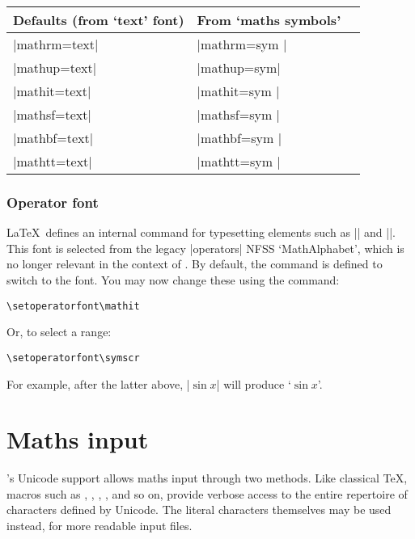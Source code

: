 \begin{table}
  \centering
  \begin{tabular}{lll}
    \toprule
    Defaults (from `text' font) & From `maths symbols' \\
    \midrule
    |mathrm=text| &   |mathrm=sym |  \\
    |mathup=text|\rlap{$^\ast$} &   |mathup=sym|{}\rlap{$^\ast$}  \\
    |mathit=text| &   |mathit=sym |  \\
    |mathsf=text| &   |mathsf=sym |  \\
    |mathbf=text| &   |mathbf=sym |  \\
    |mathtt=text| &   |mathtt=sym |  \\
    \bottomrule
  \end{tabular}
\end{table}


\subsubsection{Operator font}

\LaTeX\ defines an internal command  for typesetting elements such as |\sin| and |\cos|.
This font is selected from the legacy |operators| NFSS `MathAlphabet', which is no longer relevant in the context of .
By default, the  command is defined to switch to the  font.
You may now change these using the command:
\begin{Verbatim}
\setoperatorfont\mathit
\end{Verbatim}
Or, to select a  range:
\begin{Verbatim}
\setoperatorfont\symscr
\end{Verbatim}
\setoperatorfont\symscr
For example, after the latter above, |$\sin x$| will produce `$\sin x$'.

\setoperatorfont\mathrm


\section{Maths input}

\XeTeX's Unicode support allows maths input through two methods. Like
classical \TeX, macros such as \cmd\alpha, \cmd\sum, \cmd\pm, \cmd\leq, and
so on, provide verbose access to the entire repertoire of characters defined
by Unicode. The literal characters themselves may be used instead, for more
readable input files.

